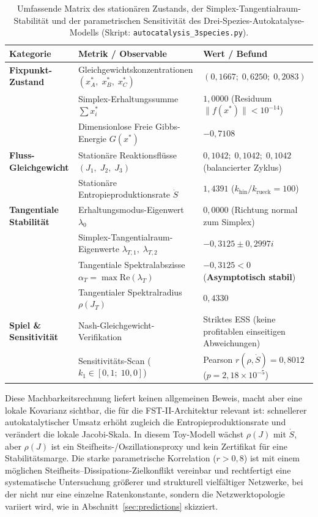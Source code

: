 \documentclass[12pt,a4paper]{article}
\theoremstyle{remark}
\begin{document}
\begin{table}[htbp]
\centering
\caption{Umfassende Matrix des stationären Zustands, der Simplex-Tangentialraum-Stabilität und der parametrischen Sensitivität des Drei-Spezies-Autokatalyse-Modells (Skript: \texttt{autocatalysis\_3species.py}).}
\label{tab:3species}
\scriptsize
\setlength{\tabcolsep}{4pt}
\begin{tabularx}{\textwidth}{@{}>{\bfseries\RaggedRight\arraybackslash}p{}>{\RaggedRight\arraybackslash}p{}>{\RaggedRight\arraybackslash}X@{}}
\toprule
\textbf{Kategorie} & \textbf{Metrik / Observable} & \textbf{Wert / Befund} \\
\midrule
\textbf{Fixpunkt-Zustand} & Gleichgewichtskonzentrationen $(x^*_A,\; x^*_B,\; x^*_C)$ & $(0{,}1667;\; 0{,}6250;\; 0{,}2083)$ \\
 & Simplex-Erhaltungssumme $\sum x_i^*$ & $1{,}0000$ (Residuum $\|f(x^*)\| < 10^{-14}$) \\
 & Dimensionlose Freie Gibbs-Energie $G(x^*)$ & $-0{,}7108$ \\
\addlinespace
\textbf{Fluss-Gleichgewicht} & Stationäre Reaktionsflüsse $(J_1,\; J_2,\; J_3)$ & $0{,}1042;\; 0{,}1042;\; 0{,}1042$ (balancierter Zyklus) \\
 & Stationäre Entropieproduktionsrate $\dot{S}$ & $1{,}4391$ ($k_{\text{hin}}/k_{\text{rueck}} = 100$) \\
\addlinespace
\textbf{Tangentiale Stabilität} & Erhaltungsmodus-Eigenwert $\lambda_0$ & $0{,}0000$ (Richtung normal zum Simplex) \\
 & Simplex-Tangentialraum-Eigenwerte $\lambda_{T,1},\; \lambda_{T,2}$ & $-0{,}3125 \pm 0{,}2997 i$ \\
 & Tangentiale Spektralabszisse $\alpha_T = \max \mathrm{Re}(\lambda_T)$ & $-0{,}3125 < 0$ (\textbf{Asymptotisch stabil}) \\
 & Tangentialer Spektralradius $\rho(J_T)$ & $0{,}4330$ \\
\addlinespace
\textbf{Spiel \& Sensitivität} & Nash-Gleichgewicht-Verifikation & Striktes ESS (keine profitablen einseitigen Abweichungen) \\
 & Sensitivitäts-Scan ($k_1 \in [0{,}1;\; 10{,}0]$) & Pearson $r(\rho, \dot{S}) = 0{,}8012$ ($p = 2{,}18 \times 10^{-5}$) \\
\bottomrule
\end{tabularx}
\end{table}

Diese Machbarkeitsrechnung liefert keinen allgemeinen Beweis, macht aber eine lokale Kovarianz sichtbar, die für die FST-II-Architektur relevant ist: schnellerer autokatalytischer Umsatz erhöht zugleich die Entropieproduktionsrate und verändert die lokale Jacobi-Skala. In diesem Toy-Modell wächst $\rho(J)$ mit $\dot{S}$, aber $\rho(J)$ ist ein Steifheits-/Oszillationsproxy und kein Zertifikat für eine Stabilitätsmarge.
Die starke parametrische Korrelation ($r>0{,}8$) ist mit einem möglichen Steifheits--Dissipations-Zielkonflikt vereinbar und rechtfertigt eine systematische Untersuchung größerer und strukturell vielfältiger Netzwerke, bei der nicht nur eine einzelne Ratenkonstante, sondern die Netzwerktopologie variiert wird, wie in Abschnitt~\ref{sec:predictions} skizziert.
\end{document}
